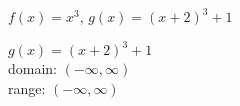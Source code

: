 {$f(x) = x^3$,  $g(x) = (x + 2)^{3} + 1$
}
{$g(x) = (x + 2)^{3} + 1$ \\ 
domain: $(-\infty, \infty)$ \\ 
range: $(-\infty, \infty)$

\begin{center}
\end{center}}